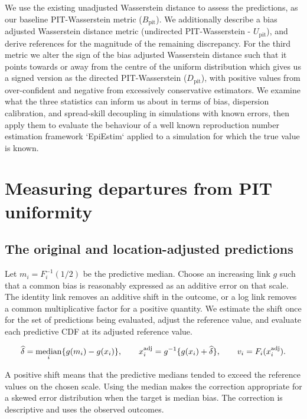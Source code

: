 \documentclass[twoside,11pt,hyphens]{article}
\newcommand{\Bpit}{B_{\mathrm{pit}}}
\newcommand{\Dpit}{D_{\mathrm{pit}}}
\newcommand{\Upit}{U_{\mathrm{pit}}}
\DeclareMathOperator{\med}{median}
\begin{document}
We use the existing unadjusted Wasserstein distance to assess the predictions, as our baseline PIT-Wasserstein metric ($\Bpit$). We additionally describe a bias adjusted Wasserstein distance metric (undirected PIT-Wasserstein - $\Upit$), and derive references for the magnitude of the remaining discrepancy. For the third metric we alter the sign of the bias adjusted Wasserstein distance such that it points towards or away from the centre of the uniform distribution which gives us a signed version as the directed PIT-Wasserstein ($\Dpit$), with positive values from over-confident and negative from excessively conservative estimators. We examine what the three statistics can inform us about in terms of bias, dispersion calibration, and spread-skill decoupling in simulations with known errors, then apply them to evaluate the behaviour of a well known reproduction number estimation framework `EpiEstim` applied to a simulation for which the true value is known.

\section{Measuring departures from PIT uniformity}
\label{sec:metrics}

\subsection{The original and location-adjusted predictions}

Let $m_i=F_i^{-1}(1/2)$ be the predictive median. Choose an increasing link $g$ such that a common bias is reasonably expressed as an additive error on that scale. The identity link removes an additive shift in the outcome, or a log link removes a common multiplicative factor for a positive quantity. We estimate the shift once for the set of predictions being evaluated, adjust the reference value, and evaluate each predictive CDF at its adjusted reference value.

\begin{equation}
 \widehat\delta=\med_i\{g(m_i)-g(x_i)\},\qquad
 x_i^{\rm adj}=g^{-1}\{g(x_i)+\widehat\delta\},\qquad
 v_i=F_i(x_i^{\rm adj}).
 \label{eq:adjust}
\end{equation}

A positive shift means that the predictive medians tended to exceed the reference values on the chosen scale. Using the median makes the correction appropriate for a skewed error distribution when the target is median bias. The correction is descriptive and uses the observed outcomes.
\end{document}
